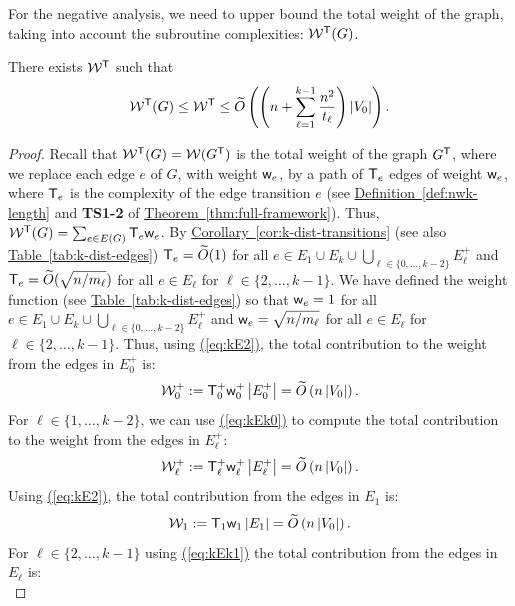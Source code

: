 \documentclass{article}
\newcommand{\eq}[1]{\hyperref[eq:#1]{(\ref*{eq:#1})}}
\newcommand{\thm}[1]{\hyperref[thm:#1]{Theorem~\ref*{thm:#1}}}
\newcommand{\cor}[1]{\hyperref[cor:#1]{Corollary~\ref*{cor:#1}}}
\newcommand{\tabl}[1]{\hyperref[tab:#1]{Table~\ref*{tab:#1}}}
\newcommand{\defin}[1]{\hyperref[def:#1]{Definition~\ref*{def:#1}}}
\renewcommand{\>}{\rangle}
\newcommand{\<}{\langle}
\renewcommand{\(}{\left(}
\renewcommand{\)}{\right)}
\def\abs#1{\left| #1 \right|}
\def\w{{\sf w}}
\begin{document}
For the negative analysis, we need to upper bound the total weight of the graph, taking into account the subroutine complexities: ${\cal W}^{\sf T}(G)$.
\begin{lemma}\label{lem:k-dist-negative}
There exists ${\cal W}^{\sf T}$ such that
\begin{align*}
{\cal W}^{\sf T}(G) \leq  {\cal W}^{\sf T} 
\leq \widetilde{O}\left(\left(n  + \sum_{\ell=1}^{k-1} \frac{n^2}{t_{\ell}}\right)\abs{V_0}\right).
\end{align*}
\end{lemma}
\begin{proof}
Recall that ${\cal W}^{\sf T}(G)={\cal W}(G^{\sf T})$ is the total weight of the graph $G^{\sf T}$, where we replace each edge $e$ of $G$, with weight $\w_e$, by a path of ${\sf T}_e$ edges of weight $\w_e$, where ${\sf T}_e$ is the complexity of the edge transition $e$ (see \defin{nwk-length} and {\bf TS1-2} of \thm{full-framework}). Thus, ${\cal W}^{\sf T}(G)=\sum_{e\in E(G)}{\sf T}_e\w_e$. By \cor{k-dist-transitions} (see also \tabl{k-dist-edges}) ${\sf T}_e=\widetilde{O}(1)$ for all $e\in E_1 \cup E_k \cup \bigcup_{\ell \in \{0,\dots,k-2\}} E_{\ell}^{+}$ and ${\sf T}_e=\widetilde{O}(\sqrt{n/m_{\ell}})$ for all $e\in E_{\ell}$ for $\ell \in \{2,\dots,k-1\}$. We have defined the weight function (see \tabl{k-dist-edges}) so that $\w_e=1$ for all $e\in E_1 \cup E_k \cup \bigcup_{\ell \in \{0,\dots,k-2\}} E_{\ell}^{+}$ and $\w_e=\sqrt{n/m_{\ell}}$ for all $e\in E_{\ell}$ for $\ell \in \{2,\dots,k-1\}$.
Thus, using \eq{kE2}, the total contribution to the weight from the edges in $E_0^+$ is:
	\begin{equation}
		{\cal W}_0^+ := {\sf T}_0^+\w_0^+\abs{E_0^+}=\widetilde{O}\left(n\abs{V_0}\right).\label{eq:kW1}
	\end{equation}
For $\ell \in \{1,\dots,k-2\}$, we can use \eq{kEk0} to compute the total contribution to the weight from the edges in $E_{\ell}^+$:
	\begin{equation}
		{\cal W}_{\ell}^+ := {\sf T}_{\ell}^+\w_{\ell}^+\abs{E_{\ell}^+}=\widetilde{O}\left(n\abs{V_0}\right).\label{eq:kWk0}
	\end{equation}
Using \eq{kE2}, the total contribution from the edges in $E_1$ is:
	\begin{equation}
		{\cal W}_1 := {\sf T}_1\w_1\abs{E_1}=\widetilde{O}\left(n\abs{V_0}\right).\label{eq:kW2}
	\end{equation}
For $\ell \in \{2,\dots,k-1\}$ using \eq{kEk1} the total contribution from the edges in $E_{\ell}$ is:
	\begin{equation}

\end{equation}
\end{proof}
\end{document}
